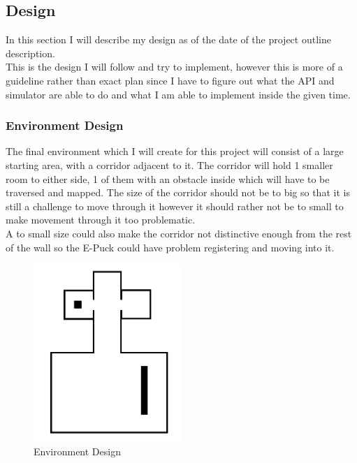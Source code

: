 \documentclass[10pt,a4paper]{article}
\begin{document}
\begin{flushleft}
\subsection{Design}
In this section I will describe my design as of the date of the project outline description. \\
This is the design I will follow and try to implement, however this is more of a guideline rather than exact plan since I have to figure out what the API and simulator are able to do and what I am able to implement inside the given time.\\

\subsubsection{Environment Design}
The final environment which I will create for this project will consist of a large starting area, with a corridor adjacent to it. The corridor will hold 1 smaller room to either side, 1 of them with an obstacle inside which will have to be traversed and mapped. The size of the corridor should not be to big so that it is still a challenge to move through it however it should rather not be to small to make movement through it too problematic. \\
A to small size could also make the corridor not distinctive enough from the rest of the wall so the E-Puck could have problem registering and moving into it.\\

\begin{figure}[h]
\centering
\includegraphics[width=0.5\textwidth]{figures/environment_example.png} 
\caption{Environment Design}
\label{Figure 2}
\end{figure}


\end{flushleft}
\end{document}
